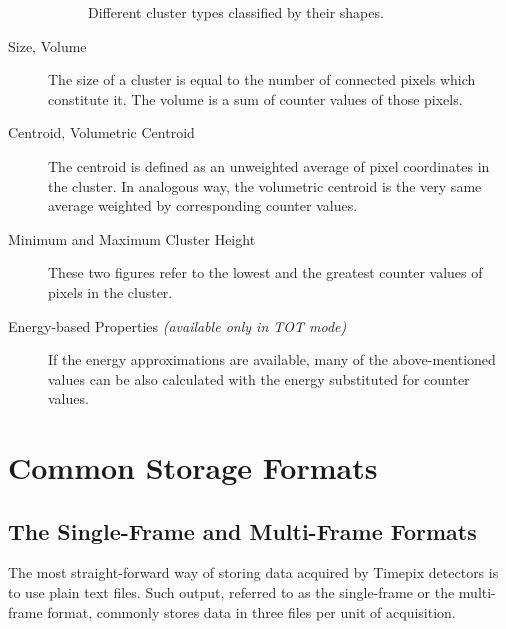 \begin{description}
\begin{figure}[t]
\begin{center}
    \caption{Different cluster types classified by their shapes.}
    \label{fig:cluster-types}
    \end{center}
    \end{figure}

	\item[Size, Volume]
	The size of a cluster is equal to the number of connected pixels which constitute it. The volume is a sum of counter values of those pixels.

	\item[Centroid, Volumetric Centroid]
	The centroid is defined as an unweighted average of pixel coordinates in the cluster. In analogous way, the volumetric centroid is the very same average weighted by corresponding counter values. 

	\item[Minimum and Maximum Cluster Height]
	These two figures refer to the lowest and the greatest counter values of pixels in the cluster.

	\item[Energy-based Properties \textit{(available only in TOT mode)}]
	If the energy approximations are available, many of the above-mentioned values can be also calculated with the energy substituted for counter values.
\end{description}

\section{Common Storage Formats}

\subsection{The Single-Frame and Multi-Frame Formats}
The most straight-forward way of storing data acquired by Timepix detectors is to use plain text files. Such output, referred to as the single-frame or the multi-frame format, commonly stores data in three files per unit of acquisition.

